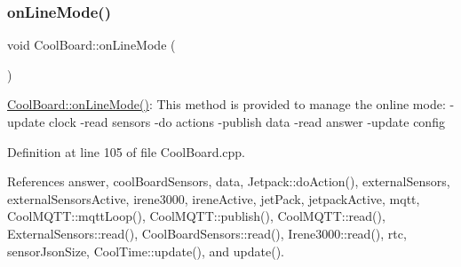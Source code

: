 \mbox{\label{classCoolBoard_aa0bbc4bc605e35618d18e68795c61363}} 
\subsubsection{\texorpdfstring{on\+Line\+Mode()}{onLineMode()}}
{\footnotesize\ttfamily void Cool\+Board\+::on\+Line\+Mode (\begin{DoxyParamCaption}{ }\end{DoxyParamCaption})}

\hyperlink{classCoolBoard_aa0bbc4bc605e35618d18e68795c61363}{Cool\+Board\+::on\+Line\+Mode()}\+: This method is provided to manage the online mode\+: -\/update clock -\/read sensors -\/do actions -\/publish data -\/read answer -\/update config 

Definition at line 105 of file Cool\+Board.\+cpp.



References answer, cool\+Board\+Sensors, data, Jetpack\+::do\+Action(), external\+Sensors, external\+Sensors\+Active, irene3000, irene\+Active, jet\+Pack, jetpack\+Active, mqtt, Cool\+M\+Q\+T\+T\+::mqtt\+Loop(), Cool\+M\+Q\+T\+T\+::publish(), Cool\+M\+Q\+T\+T\+::read(), External\+Sensors\+::read(), Cool\+Board\+Sensors\+::read(), Irene3000\+::read(), rtc, sensor\+Json\+Size, Cool\+Time\+::update(), and update().


